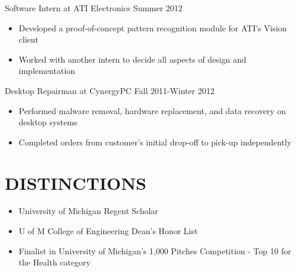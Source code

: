 \documentclass[line,margin]{res}
\begin{document}
\begin{resume}
                {\sc Software Intern at ATI Electronics} \hfill            Summer 2012 \\
                 \begin{itemize}  \itemsep -2pt %
                 \item Developed a proof-of-concept pattern recognition module for ATI’s Vision client
                 \item Worked with another intern to decide all aspects of design and implementation
                 \end{itemize} 
                {\sc Desktop Repairman at CynergyPC} \hfill        Fall 2011-Winter 2012 \\
                  \begin{itemize}
                   \item Performed malware removal, hardware replacement, and data recovery on desktop systems
                   \item Completed orders from customer’s initial drop-off to pick-up independently 
                   \end{itemize} 

\section{DISTINCTIONS}
    \begin{itemize}
    \item University of Michigan Regent Scholar
    \item U of M College of Engineering Dean’s Honor List
    \item Finalist in University of Michigan’s 1,000 Pitches Competition - Top 10 for the Health category
    \end{itemize}
 

 

\end{resume}
\end{document}
